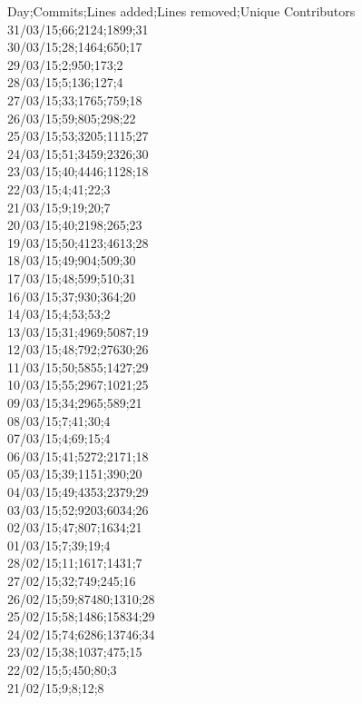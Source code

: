 \noindent
Day;Commits;Lines added;Lines removed;Unique Contributors \\
31/03/15;66;2124;1899;31 \\
30/03/15;28;1464;650;17 \\
29/03/15;2;950;173;2 \\
28/03/15;5;136;127;4 \\
27/03/15;33;1765;759;18 \\
26/03/15;59;805;298;22 \\
25/03/15;53;3205;1115;27 \\
24/03/15;51;3459;2326;30 \\
23/03/15;40;4446;1128;18 \\
22/03/15;4;41;22;3 \\
21/03/15;9;19;20;7 \\
20/03/15;40;2198;265;23 \\
19/03/15;50;4123;4613;28 \\
18/03/15;49;904;509;30 \\
17/03/15;48;599;510;31 \\
16/03/15;37;930;364;20 \\
14/03/15;4;53;53;2 \\
13/03/15;31;4969;5087;19 \\
12/03/15;48;792;27630;26 \\
11/03/15;50;5855;1427;29 \\
10/03/15;55;2967;1021;25 \\
09/03/15;34;2965;589;21 \\
08/03/15;7;41;30;4 \\
07/03/15;4;69;15;4 \\
06/03/15;41;5272;2171;18 \\
05/03/15;39;1151;390;20 \\
04/03/15;49;4353;2379;29 \\
03/03/15;52;9203;6034;26 \\
02/03/15;47;807;1634;21 \\
01/03/15;7;39;19;4 \\
28/02/15;11;1617;1431;7 \\
27/02/15;32;749;245;16 \\
26/02/15;59;87480;1310;28 \\
25/02/15;58;1486;15834;29 \\
24/02/15;74;6286;13746;34 \\
23/02/15;38;1037;475;15 \\
22/02/15;5;450;80;3 \\
21/02/15;9;8;12;8 \\
